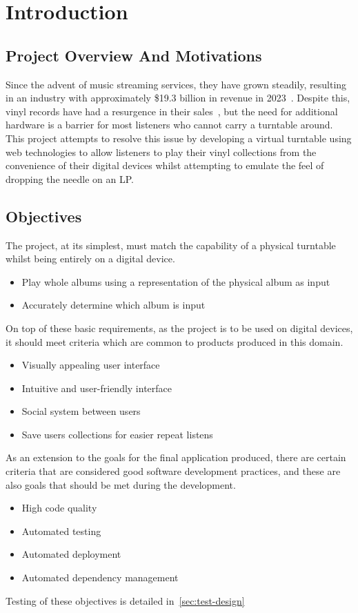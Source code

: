 \chapter{Introduction}\label{cha:intro}

\section{Project Overview And Motivations}
Since the advent of music streaming services, they have grown steadily, resulting in an industry with approximately \$19.3 billion in revenue in 2023~\cite{IFPI}. Despite this, vinyl records have had a resurgence in their sales~\cite{BPI}, but the need for additional hardware is a barrier for most listeners who cannot carry a turntable around. This project attempts to resolve this issue by developing a virtual turntable using web technologies to allow listeners to play their vinyl collections from the convenience of their digital devices whilst attempting to emulate the feel of dropping the needle on an LP.\@

\section{Objectives}\label{sec:objectives}
The project, at its simplest, must match the capability of a physical turntable whilst being entirely on a digital device.
\begin{itemize}
    \item Play whole albums using a representation of the physical album as input
    \item Accurately determine which album is input
\end{itemize}
On top of these basic requirements, as the project is to be used on digital devices, it should meet criteria which are common to products produced in this domain.
\begin{itemize}
    \item Visually appealing user interface
    \item Intuitive and user-friendly interface
    \item Social system between users
    \item Save users collections for easier repeat listens
\end{itemize}
As an extension to the goals for the final application produced, there are certain criteria that are considered good software development practices, and these are also goals that should be met during the development.
\begin{itemize}
    \item High code quality
    \item Automated testing
    \item Automated deployment
    \item Automated dependency management
\end{itemize}
Testing of these objectives is detailed in~\ref{sec:test-design}

